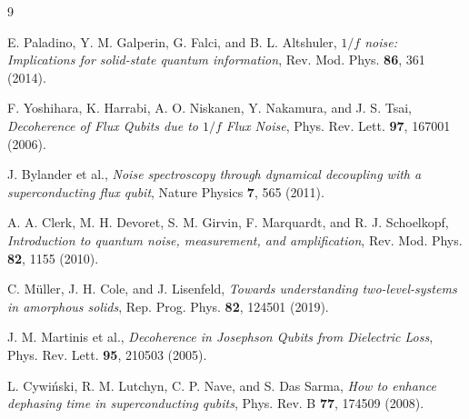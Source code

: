 \documentclass[10pt]{article}
\begin{document}
\begin{thebibliography}{9}

E. Paladino, Y. M. Galperin, G. Falci, and B. L. Altshuler,
\textit{$1/f$ noise: Implications for solid-state quantum information},
Rev. Mod. Phys. \textbf{86}, 361 (2014).

F. Yoshihara, K. Harrabi, A. O. Niskanen, Y. Nakamura, and J. S. Tsai,
\textit{Decoherence of Flux Qubits due to $1/f$ Flux Noise},
Phys. Rev. Lett. \textbf{97}, 167001 (2006).

J. Bylander et al.,
\textit{Noise spectroscopy through dynamical decoupling with a superconducting flux qubit},
Nature Physics \textbf{7}, 565 (2011).

A. A. Clerk, M. H. Devoret, S. M. Girvin, F. Marquardt, and R. J. Schoelkopf,
\textit{Introduction to quantum noise, measurement, and amplification},
Rev. Mod. Phys. \textbf{82}, 1155 (2010).

C. M\"{u}ller, J. H. Cole, and J. Lisenfeld,
\textit{Towards understanding two-level-systems in amorphous solids},
Rep. Prog. Phys. \textbf{82}, 124501 (2019).

J. M. Martinis et al.,
\textit{Decoherence in Josephson Qubits from Dielectric Loss},
Phys. Rev. Lett. \textbf{95}, 210503 (2005).

L. Cywi\'{n}ski, R. M. Lutchyn, C. P. Nave, and S. Das Sarma,
\textit{How to enhance dephasing time in superconducting qubits},
Phys. Rev. B \textbf{77}, 174509 (2008).

\end{thebibliography}
\end{document}
